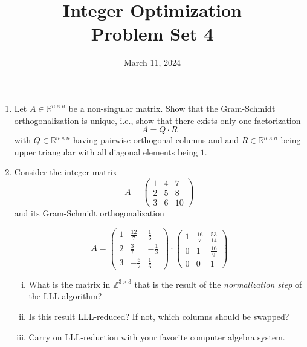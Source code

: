 \documentclass[11pt,a4paper]{article}
\title{Integer Optimization  \\ Problem Set 4 }
\date{ March 11, 2024}
\begin{document}
\maketitle 




\begin{enumerate}[1)]

\item Let $A ∈ ℝ^{ n ×n}$ be a non-singular matrix. Show that the Gram-Schmidt orthogonalization is unique, i.e., show that there exists only one factorization
  \begin{displaymath}
    A = Q ⋅ R
  \end{displaymath}
  with $Q ∈ℝ^{n×n}$ having pairwise orthogonal columns and and $R ∈ ℝ^{ n ×n}$ being upper triangular with all diagonal elements being $1$.

  
\item Consider the integer matrix 
  \begin{displaymath}
A =     \left(\begin{array}{rrr}
1 & 4 & 7 \\
2 & 5 & 8 \\
3 & 6 & 10
\end{array}\right)
\end{displaymath}
and its Gram-Schmidt orthogonalization

\begin{displaymath}
  A = \left(\begin{array}{rrr}
1 & \frac{12}{7} & \frac{1}{6} \\
2 & \frac{3}{7} & -\frac{1}{3} \\
3 & -\frac{6}{7} & \frac{1}{6}
\end{array}\right)
⋅\left(\begin{array}{rrr}
1 & \frac{16}{7} & \frac{53}{14} \\
0 & 1 & \frac{16}{9} \\
0 & 0 & 1
\end{array}\right) 
\end{displaymath}
\begin{enumerate}[i)]
\item What is the matrix in $ℤ^{3 ×3}$ that is the result of the \emph{normalization step} of the LLL-algorithm?
\item Is this result LLL-reduced? If not, which columns should be swapped?
\item Carry on LLL-reduction  with your favorite computer algebra system.


\end{enumerate}
\end{enumerate}
\end{document}
